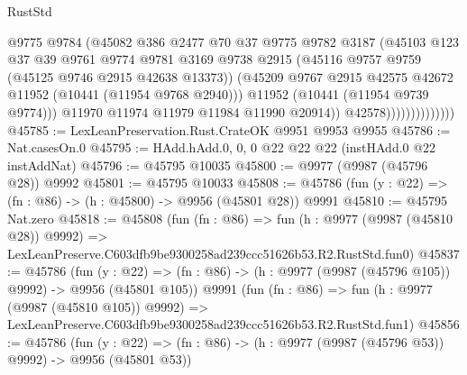 \begin{lexlean}{RustStd}
\begin{coremodule}
                                  @9775
                                  @9784
                                  (@45082
                                    @386
                                    @2477
                                    @70
                                    @37
                                    @9775
                                    @9782
                                    @3187
                                    (@45103
                                      @123
                                      @37
                                      @39
                                      @9761
                                      @9774
                                      @9781
                                      @3169
                                      @9738
                                      @2915
                                      (@45116 @9757 @9759 (@45125 @9746 @2915 @42638 @13373))
                                      (@45209
                                        @9767
                                        @2915
                                        @42575
                                        @42672
                                        @11952
                                        (@10441 (@11954 @9768 @2940)))
                                      @11952
                                      (@10441 (@11954 @9739 @9774)))
                                    @11970
                                    @11974
                                    @11979
                                    @11984
                                    @11990
                                    @20914))
                                @42578))))))))))))))
@45785 := LexLeanPreservation.Rust.CrateOK @9951 @9953 @9955
@45786 := Nat.casesOn.{0}
@45795 := HAdd.hAdd.{0, 0, 0} @22 @22 @22 (instHAdd.{0} @22 instAddNat)
@45796 := @45795 @10035
@45800 := @9977 (@9987 (@45796 @28)) @9992
@45801 := @45795 @10033
@45808 := @45786 (fun (y : @22) => (fn : @86) -> (h : @45800) -> @9956 (@45801 @28)) @9991
@45810 := @45795 Nat.zero
@45818 := @45808
    (fun (fn : @86) =>
    fun (h : @9977 (@9987 (@45810 @28)) @9992) =>
    LexLeanPreserve.C603dfb9be9300258ad239ccc51626b53.R2.RustStd.fun0)
@45837 := @45786
    (fun (y : @22) => (fn : @86) -> (h : @9977 (@9987 (@45796 @105)) @9992) -> @9956 (@45801 @105))
    @9991
    (fun (fn : @86) =>
    fun (h : @9977 (@9987 (@45810 @105)) @9992) =>
    LexLeanPreserve.C603dfb9be9300258ad239ccc51626b53.R2.RustStd.fun1)
@45856 := @45786
    (fun (y : @22) => (fn : @86) -> (h : @9977 (@9987 (@45796 @53)) @9992) -> @9956 (@45801 @53))

\end{coremodule}
\end{lexlean}
